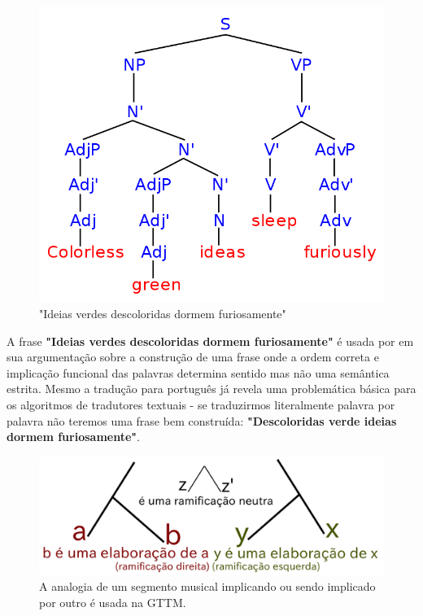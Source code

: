 \documentclass[
	12pt,				%
	openright,			%
	twoside,			%
	a4paper,			%
	english,			%
	french,				%
	spanish,			%
	brazil				%
	]{abntex2}
\begin{document}
\begin{figure}[!h]
	\caption{\label{fig_grafico}"Ideias verdes descoloridas dormem furiosamente"\cite{chomsky1957syntactic}}
	\begin{center}
	    \includegraphics[scale=0.45]{gttm/colorless.png}
	\end{center}
\end{figure}

A frase \textbf{"Ideias verdes descoloridas dormem furiosamente"} é usada por  em sua argumentação sobre a construção de uma frase onde a ordem correta e implicação funcional das palavras determina sentido mas não uma semântica estrita. Mesmo a tradução para português já revela uma problemática básica para os algoritmos de tradutores textuais - se traduzirmos literalmente palavra por palavra não teremos uma frase bem construída: \textbf{"Descoloridas verde ideias dormem furiosamente"}.


\begin{figure}[!h]
	\caption{\label{fig_grafico}A analogia de um segmento musical implicando ou sendo implicado por outro é usada na GTTM.}
	\begin{center}
	    \includegraphics[scale=0.4]{gttm/ramificacoes_arvore.pdf}
	\end{center}
\end{figure}
\end{document}
